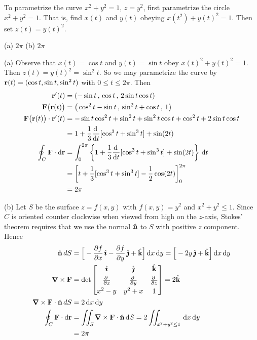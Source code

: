 \begin{hint} 
To parametrize the curve $x^2+y^2=1$, $z=y^2$, first parametrize the 
circle $x^2+y^2=1$. That is, find $x(t)$ and 
$y(t)$ obeying $x(t^2)+y(t)^2=1$. Then set $z(t) =y(t)^2$.
\end{hint}

\begin{answer} 
(a) $2\pi$ \qquad
(b) $2\pi$
\end{answer}

\begin{solution} 
(a) Observe that $x(t)=\cos t$ and $y(t)=\sin t$ obey $x(t)^2+y(t)^2=1$.
Then $z(t)=y(t)^2=\sin ^2 t$.  So we may parametrize the curve by
$\mathbf{r}(t)=(\cos t, \sin t, \sin^2 t)$ with $0\le t\le 2\pi$.
Then
\begin{align*}
\vr'(t)&=(-\sin t\,,\, \cos t \,,\, 2\sin t\cos t)\\
\vF\big(\vr(t)\big)&=\big(\cos^2t-\sin t\,,\,\sin^2t+\cos t\,,\,1\big)\\
\vF\big(\vr(t)\big)\cdot\vr'(t)&=-\sin t\cos^2 t+\sin^2 t+\sin^2t\cos t
+\cos^2t+2\sin t\cos t\\
&=1+\frac{1}{3}\diff{}{t}[\cos^3t+\sin^3 t]+\sin(2t)\\
\oint_C\vF\cdot \dee{\vr}
&=\int_0^{2\pi}
\left\{1+\frac{1}{3}\diff{}{t}[\cos^3t+\sin^3 t]+\sin(2t)\right\}\,\dee{t} \\
&=\left[t+\frac{1}{3}[\cos^3t+\sin^3 t] -\frac{1}{2}\cos(2t) \right]_0^{2\pi}\\
&=2\pi
\end{align*}

(b) Let $S$ be the surface $z=f(x,y)$ with $f(x,y)=y^2$ 
and $x^2+y^2\le 1$. Since $C$ is oriented counter clockwise when
viewed from high on the $z$-axis, Stokes' theorem requires that we use 
the normal $\hat{\mathbf{n}}$ to $S$ with positive $z$ component. Hence
\begin{align*}
\hn\,dS&=\Big[-\pdiff{f}{x}\,\hi
-\pdiff{f}{y}\,\hj+\hk\Big]\,\dee{x}\,\dee{y}
=\Big[-2y\,\hj+\hk\Big]\,\dee{x}\,\dee{y}\\
\vnabla\times\vF&=\det\left[\begin{matrix}\hi & \hj & \hk \\[0.05in]
                  \pdiff{}{x} &
                  \pdiff{}{y} &
                  \pdiff{}{z} \\[0.05in]
                  x^2-y & y^2+x & 1 \end{matrix}\right] 
=2\hk\\
\vnabla\times\vF\cdot\hn\,dS&=2\,\dee{x}\,\dee{y}\\
\oint_C\vF\cdot \dee{\vr}
&=\dblInt_S\vnabla\times\vF\cdot\hn\,\dee{S}
=2\dblInt_{x^2+y^2\le 1}\,\dee{x}\,\dee{y}\\
&=2\pi
\end{align*}

\end{solution}


